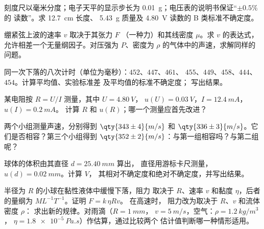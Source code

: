 \begin{exercise}[$\star$]\label{exo:b1:units-dimensions:4}
刻度尺以毫米分度；电子天平的显示步长为
\qty{0.01}{g}；电压表的说明书保证“$\pm 0.5\%$ 的
读数”。求 \qty{12.7}{cm} 长度、
\qty{5.43}{g} 质量及 \qty{4.80}{V} 读数的 B 类标准不确定度。
\end{exercise}

\begin{exercise}[$\star\star$]\label{exo:b1:units-dimensions:5}
绷紧弦上波的速率 $v$ 取决于其张力 $F$
（一种力）和其线密度 $\mu$。求 $v$ 的表达式，
允许相差一个无量纲因子。对压强为 $P$、密度为
$\rho$ 的气体中的声速，求解同样的问题。
\end{exercise}

\begin{exercise}[$\star\star$]\label{exo:b1:units-dimensions:6}
同一次下落的八次计时（单位为毫秒）：$452$、$447$、$461$、
$455$、$449$、$458$、$444$、$454$。计算平均值、实验标准差
及平均值的标准不确定度；
写出结果。
\end{exercise}

\begin{exercise}[$\star\star$]\label{exo:b1:units-dimensions:7}
某电阻按 $R = U/I$ 测量，其中 $U = \qty{4.80}{V}$，
$u(U) = \qty{0.03}{V}$，$I = \qty{12.4}{mA}$，$u(I) = \qty{0.2}{mA}$。
计算 $R$ 和 $u(R)$；哪一个测量应首先改进？
\end{exercise}

\begin{exercise}[$\star\star$]\label{exo:b1:units-dimensions:8}
两个小组测量声速，分别得到 $\qty{343\pm4}{m/s}$ 和
$\qty{336\pm3}{m/s}$。它们是否相容？第三个小组得到
$\qty{352\pm2}{m/s}$：与第一组相容吗？与第二组呢？
\end{exercise}

\begin{exercise}[$\star\star$]\label{exo:b1:units-dimensions:9}
球体的体积由其直径 $d = \qty{25.40}{mm}$ 算出，
直径用游标卡尺测量，$u(d) = \qty{0.02}{mm}$。计算 $V$，
其相对不确定度和绝对不确定度，并写出结果。
\end{exercise}

\begin{exercise}[$\star\star\star$]\label{exo:b1:units-dimensions:10}
半径为 $R$ 的小球在黏性液体中缓慢下落，阻力
取决于 $R$、速率 $v$ 和黏度 $\eta$，后者的量纲为 $M L^{-1} T^{-1}$。证明 $F = k\,\eta R v$。
在高速时，
阻力改为取决于 $R$、$v$ 和流体密度 $\rho$：
求出新的规律。对雨滴（$R = \qty{1}{mm}$，
$v = \qty{5}{m/s}$，空气：$\rho = \qty{1.2}{kg/m^3}$，
$\eta = \qty{1.8e-5}{Pa.s}$）作估算，通过比较两个
估计值判断哪一种情形适用。
\end{exercise}

